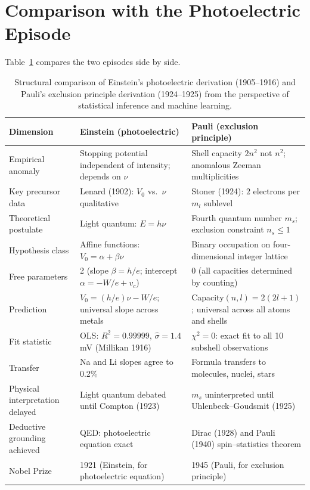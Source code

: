 \documentclass[12pt]{article}
\begin{document}
\section{Comparison with the Photoelectric Episode}
\label{sec:comparison}

Table~\ref{tab:comparison} compares the two episodes side by side.

\begin{table}[ht]
\centering
\caption{Structural comparison of Einstein's photoelectric derivation (1905--1916)
and Pauli's exclusion principle derivation (1924--1925) from the perspective
of statistical inference and machine learning.}
\label{tab:comparison}
\medskip
\begin{tabular}{p{3.5cm}p{5cm}p{5cm}}
\toprule
Dimension & Einstein (photoelectric) & Pauli (exclusion principle) \\
\midrule
Empirical anomaly & Stopping potential
  independent of intensity; depends on $\nu$ &
  Shell capacity $2n^2$ not $n^2$; anomalous
  Zeeman multiplicities \\
Key precursor data & Lenard (1902):
  $V_0$ vs.\ $\nu$ qualitative &
  Stoner (1924): $2$ electrons per $m_l$
  sublevel \\
Theoretical postulate & Light quantum:
  $E = h\nu$ &
  Fourth quantum number $m_s$; exclusion
  constraint $n_s \leq 1$ \\
Hypothesis class & Affine functions:
  $V_0 = \alpha + \beta\nu$ &
  Binary occupation on four-dimensional
  integer lattice \\
Free parameters & 2 (slope $\beta = h/e$;
  intercept $\alpha = -W/e + v_c$) &
  0 (all capacities determined by counting) \\
Prediction & $V_0 = (h/e)\nu - W/e$;
  universal slope across metals &
  Capacity$(n,l) = 2(2l+1)$;
  universal across all atoms and shells \\
Fit statistic & OLS: $R^2 = 0.99999$,
  $\hat\sigma = 1.4$\,mV (Millikan 1916) &
  $\chi^2 = 0$: exact fit to all 10
  subshell observations \\
Transfer & Na and Li slopes agree to 0.2\% &
  Formula transfers to molecules, nuclei,
  stars \\
Physical interpretation delayed & Light
  quantum debated until Compton (1923) &
  $m_s$ uninterpreted until Uhlenbeck--Goudsmit
  (1925) \\
Deductive grounding achieved & QED:
  photoelectric equation exact &
  Dirac (1928) and Pauli (1940) spin--statistics
  theorem \\
Nobel Prize & 1921 (Einstein, for
  photoelectric equation) &
  1945 (Pauli, for exclusion principle) \\
\bottomrule
\end{tabular}
\end{table}
\end{document}
